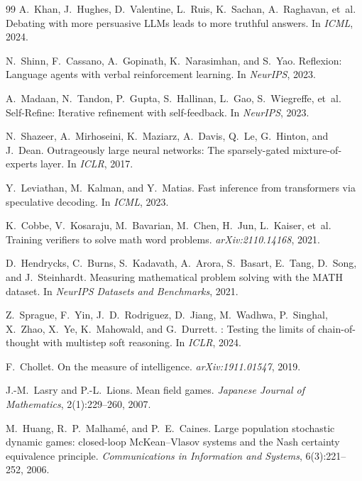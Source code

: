 \documentclass[11pt]{amsart}
\newcommand\1{{\mathds{1}}}
\theoremstyle{definition}
\theoremstyle{remark}
\numberwithin{equation}{section}
\begin{document}
\begin{thebibliography}{99}
A.~Khan, J.~Hughes, D.~Valentine, L.~Ruis, K.~Sachan, A.~Raghavan, et~al.
\newblock Debating with more persuasive {LLMs} leads to more truthful answers.
\newblock In \emph{ICML}, 2024.

N.~Shinn, F.~Cassano, A.~Gopinath, K.~Narasimhan, and S.~Yao.
\newblock Reflexion: Language agents with verbal reinforcement learning.
\newblock In \emph{NeurIPS}, 2023.

A.~Madaan, N.~Tandon, P.~Gupta, S.~Hallinan, L.~Gao, S.~Wiegreffe, et~al.
\newblock Self-{R}efine: Iterative refinement with self-feedback.
\newblock In \emph{NeurIPS}, 2023.

N.~Shazeer, A.~Mirhoseini, K.~Maziarz, A.~Davis, Q.~Le, G.~Hinton, and J.~Dean.
\newblock Outrageously large neural networks: The sparsely-gated mixture-of-experts layer.
\newblock In \emph{ICLR}, 2017.

Y.~Leviathan, M.~Kalman, and Y.~Matias.
\newblock Fast inference from transformers via speculative decoding.
\newblock In \emph{ICML}, 2023.

K.~Cobbe, V.~Kosaraju, M.~Bavarian, M.~Chen, H.~Jun, L.~Kaiser, et~al.
\newblock Training verifiers to solve math word problems.
\newblock \emph{arXiv:2110.14168}, 2021.

D.~Hendrycks, C.~Burns, S.~Kadavath, A.~Arora, S.~Basart, E.~Tang, D.~Song, and J.~Steinhardt.
\newblock Measuring mathematical problem solving with the {MATH} dataset.
\newblock In \emph{NeurIPS Datasets and Benchmarks}, 2021.


Z.~Sprague, F.~Yin, J.~D.~Rodriguez, D.~Jiang, M.~Wadhwa, P.~Singhal, X.~Zhao, X.~Ye, K.~Mahowald, and G.~Durrett.
: Testing the limits of chain-of-thought with multistep soft reasoning.
\newblock In \emph{ICLR}, 2024.

F.~Chollet.
\newblock On the measure of intelligence.
\newblock \emph{arXiv:1911.01547}, 2019.

J.-M.~Lasry and P.-L.~Lions.
\newblock Mean field games.
\newblock \emph{Japanese Journal of Mathematics}, 2(1):229--260, 2007.

M.~Huang, R.~P.~Malham\'e, and P.~E.~Caines.
\newblock Large population stochastic dynamic games: closed-loop {McKean--Vlasov} systems and the {Nash} certainty equivalence principle.
\newblock \emph{Communications in Information and Systems}, 6(3):221--252, 2006.


\end{thebibliography}
\end{document}
